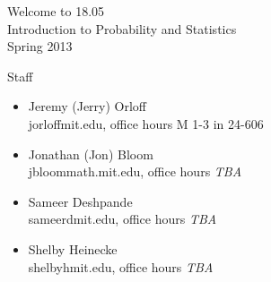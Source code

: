 

\def\myat{\makeatletter@\makeatother}
\def\myheart{{\color{red} \heartsuit}}
\def\mydiamond{{\color{red} \diamondsuit}}

\date{February 5, 2013}
\author{18.05 Class 1}






\begin{frame}[plain]
\begin{center} 
\Large \color{blue} Welcome to 18.05\\
Introduction to Probability and Statistics\\
Spring 2013
\end{center}


\end{frame}

\begin{frame}{Staff}
\begin{itemize}

\item {\Large Jeremy (Jerry) Orloff}\\jorloff\myat mit.edu, office hours M 1-3 in 24-606\\
\item {\Large Jonathan (Jon) Bloom}\\jbloom\myat math.mit.edu, office hours \emph{TBA}\\
\item {\Large Sameer Deshpande}\\sameerd\myat mit.edu, office hours \emph{TBA}\\
\item {\Large Shelby Heinecke}\\shelbyh\myat mit.edu, office hours \emph{TBA}
\end{itemize}
\end{frame}

